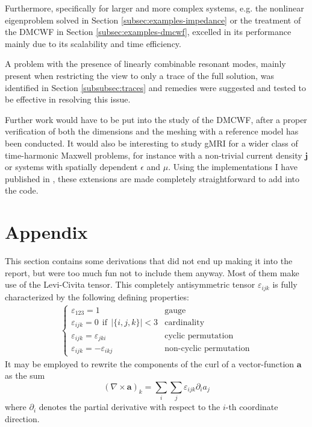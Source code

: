 \documentclass[11pt, a4paper]{article}
\begin{document}
Furthermore, specifically for larger and more complex systems, e.g.
the nonlinear eigenproblem solved in Section \ref{subsec:examples-impedance}
or the treatment of the \acrfull{DMCWF} in Section \ref{subsec:examples-dmcwf},
excelled in its performance mainly due to its scalability and time efficiency.

A problem with the presence of linearly combinable resonant modes, mainly present
when restricting the view to only a trace of the full solution, was identified
in Section \ref{subsubsec:traces} and remedies were suggested and tested to be
effective in resolving this issue.

Further work would have to be put into the study of the \acrshort{DMCWF}, after
a proper verification of both the dimensions and the meshing with a reference
model has been conducted. It would also be interesting to study \acrshort{gMRI}
for a wider class of time-harmonic Maxwell problems, for instance with a non-trivial
current density $\mathbf{j}$ or systems with spatially dependent $\epsilon$ and
$\mu$. Using the implementations I have published in \cite{git}, these extensions
are made completely straightforward to add into the code.

\newpage


\newpage
\section*{Appendix}
\label{sec:appendix}

This section contains some derivations that did not end up making it into the
report, but were too much fun not to include them anyway. Most of them make
use of the Levi-Civita tensor. This completely antisymmetric tensor
$\varepsilon_{ijk}$ is fully characterized by the following defining properties:
\begin{align}
    \begin{cases}
        \varepsilon_{123} = 1 & \text{gauge}\\
        \varepsilon_{ijk} = 0~~\text{if}~~|\{i, j, k\}| < 3 & \text{cardinality} \\
        \varepsilon_{ijk} = \varepsilon_{jki} & \text{cyclic permutation}\\
        \varepsilon_{ijk} = - \varepsilon_{ikj} & \text{non-cyclic permutation}
        \label{equ:levi-civita-properties}
    \end{cases}
\end{align}
It may be employed to rewrite the
components of the curl of a vector-function $\mathbf{a}$ as the sum
\begin{equation}
    (\nabla \times \mathbf{a})_k = \sum_i \sum_j \varepsilon_{ijk} \partial_i a_j \label{equ:levi-civita}
\end{equation}
where $\partial_i$ denotes the partial derivative with respect to the $i$-th coordinate
direction. 
\end{document}
